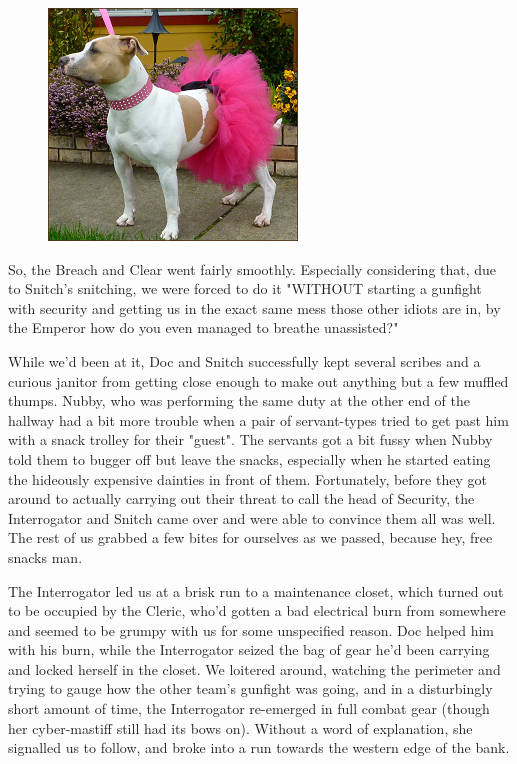 \begin{figure}
	\begin{center}
		\includegraphics[width=\figwidth]{pics/18/27.png}
	\end{center}
\end{figure}
So, the Breach and Clear went fairly smoothly. 
Especially considering that, due to Snitch's snitching, we were forced to do it "WITHOUT starting a gunfight with security and getting us in the exact same mess those other idiots are in, by the Emperor how do you even managed to breathe unassisted?" 

While we'd been at it, Doc and Snitch successfully kept several scribes and a curious janitor from getting close enough to make out anything but a few muffled thumps. 
Nubby, who was performing the same duty at the other end of the hallway had a bit more trouble when a pair of servant-types tried to get past him with a snack trolley for their "guest". 
The servants got a bit fussy when Nubby told them to bugger off but leave the snacks, especially when he started eating the hideously expensive dainties in front of them. 
Fortunately, before they got around to actually carrying out their threat to call the head of Security, the Interrogator and Snitch came over and were able to convince them all was well. 
The rest of us grabbed a few bites for ourselves as we passed, because hey, free snacks man.

The Interrogator led us at a brisk run to a maintenance closet, which turned out to be occupied by the Cleric, who'd gotten a bad electrical burn from somewhere and seemed to be grumpy with us for some unspecified reason. 
Doc helped him with his burn, while the Interrogator seized the bag of gear he'd been carrying and locked herself in the closet. 
We loitered around, watching the perimeter and trying to gauge how the other team's gunfight was going, and in a disturbingly short amount of time, the Interrogator re-emerged in full combat gear (though her cyber-mastiff still had its bows on). 
Without a word of explanation, she signalled us to follow, and broke into a run towards the western edge of the bank.

